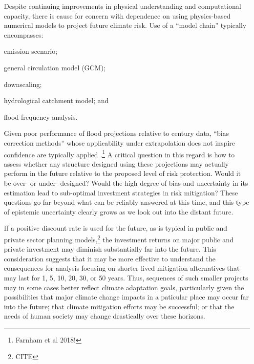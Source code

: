 \documentclass[12pt]{article}
\begin{document}
Despite continuing improvements in physical understanding and computational capacity, there is cause for concern with dependence on using physics-based numerical models to project future climate risk.
Use of a ``model chain'' typically encompasses:
\begin{enumerate*}[label= (\roman*) ]
  \item emission scenario;
  \item general circulation model (GCM);
  \item downscaling;
  \item hydrological catchment model; and
  \item flood frequency analysis.
\end{enumerate*}
Given poor performance of flood projections relative to  century data, ``bias correction methods'' whose applicability under extrapolation does not inspire confidence are typically applied \citep{Dankers2009,Ott2013,Merz2014,Dittes2017}.\footnote{Farnham et al 2018!}
A critical question in this regard is how to assess whether any structure designed using these projections may actually perform in the future relative to the proposed level of risk protection.
Would it be over- or under- designed?
Would the high degree of bias and uncertainty in its estimation lead to sub-optimal investment strategies in risk mitigation?
These questions go far beyond what can be reliably answered at this time, and this type of epistemic uncertainty clearly grows as we look out into the distant future.

If a positive discount rate is used for the future, as is typical in public and private sector planning models,\footnote{CITE} the investment returns on major public and private investment may diminish substantially far into the future.
This consideration suggests that it may be more effective to understand the consequences for analysis focusing on shorter lived mitigation alternatives that may last for 1, 5, 10, 20, 30, or 50 years.
Thus, sequences of such smaller projects may in some cases better reflect climate adaptation goals, particularly given the possibilities that major climate change impacts in a paticular place may occur far into the future; that climate mitigation efforts may be successful; or that the needs of human society may change drastically over these horizons.
\end{document}
